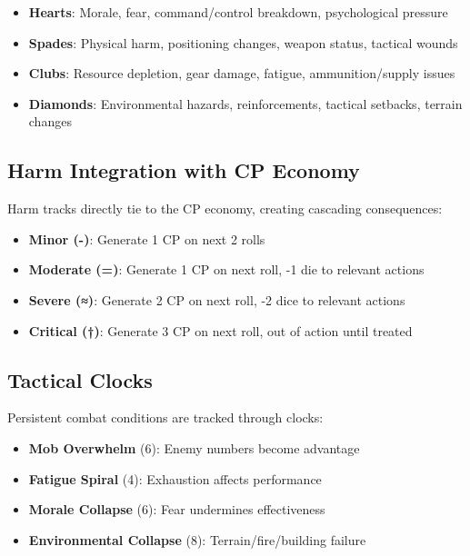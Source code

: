 \begin{itemize}
    \item \textbf{Hearts}: Morale, fear, command/control breakdown, psychological pressure
    \item \textbf{Spades}: Physical harm, positioning changes, weapon status, tactical wounds
    \item \textbf{Clubs}: Resource depletion, gear damage, fatigue, ammunition/supply issues
    \item \textbf{Diamonds}: Environmental hazards, reinforcements, tactical setbacks, terrain changes
\end{itemize}

\subsection*{Harm Integration with CP Economy}

Harm tracks directly tie to the CP economy, creating cascading consequences:

\begin{itemize}
    \item \textbf{Minor (-)}: Generate 1 CP on next 2 rolls
    \item \textbf{Moderate (=)}: Generate 1 CP on next roll, -1 die to relevant actions
    \item \textbf{Severe (≈)}: Generate 2 CP on next roll, -2 dice to relevant actions  
    \item \textbf{Critical (†)}: Generate 3 CP on next roll, out of action until treated
\end{itemize}

\subsection*{Tactical Clocks}

Persistent combat conditions are tracked through clocks:

\begin{itemize}
    \item \textbf{Mob Overwhelm} (6): Enemy numbers become advantage
    \item \textbf{Fatigue Spiral} (4): Exhaustion affects performance
    \item \textbf{Morale Collapse} (6): Fear undermines effectiveness
    \item \textbf{Environmental Collapse} (8): Terrain/fire/building failure
\end{itemize}

